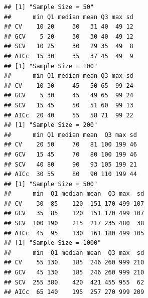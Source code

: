 \documentclass{article}\usepackage{graphicx, color}
\makeatletter
\newenvironment{kframe}{%
 \def\at@end@of@kframe{}%
 \ifinner\ifhmode%
  \def\at@end@of@kframe{\end{minipage}}%
  \begin{minipage}{\columnwidth}%
 \fi\fi%
 \def\FrameCommand##1{\hskip\@totalleftmargin \hskip-\fboxsep
 \colorbox{shadecolor}{##1}\hskip-\fboxsep
     \hskip-\linewidth \hskip-\@totalleftmargin \hskip\columnwidth}%
 \MakeFramed {\advance\hsize-\width
   \@totalleftmargin\z@ \linewidth\hsize
   \@setminipage}}%
 {\par\unskip\endMakeFramed%
 \at@end@of@kframe}
\newenvironment{knitrout}{}{} %
\makeatother
\begin{document}
\begin{knitrout}
\color{fgcolor}\begin{kframe}
\begin{verbatim}
## [1] "Sample Size = 50"
##      min Q1 median mean Q3 max sd
## CV    10 20     30   31 40  49 12
## GCV    5 20     30   30 40  49 12
## SCV   10 25     30   29 35  49  8
## AICc  15 30     35   37 45  49  9
## [1] "Sample Size = 100"
##      min Q1 median mean Q3 max sd
## CV    10 30     45   50 65  99 24
## GCV    5 30     45   49 65  99 24
## SCV   15 45     50   51 60  99 13
## AICc  20 40     55   58 71  99 22
## [1] "Sample Size = 200"
##      min Q1 median mean  Q3 max sd
## CV    20 50     70   81 100 199 46
## GCV   15 45     70   80 100 199 46
## SCV   40 80     90   93 105 199 21
## AICc  30 55     80   90 110 199 44
## [1] "Sample Size = 500"
##      min  Q1 median mean  Q3 max  sd
## CV    30  85    120  151 170 499 107
## GCV   35  85    120  151 170 499 107
## SCV  100 190    215  217 235 480  38
## AICc  45  95    130  161 180 499 105
## [1] "Sample Size = 1000"
##      min  Q1 median mean  Q3 max  sd
## CV    55 130    185  246 260 999 210
## GCV   45 130    185  246 260 999 210
## SCV  255 380    420  421 455 955  62
## AICc  65 140    195  257 270 999 209
\end{verbatim}
\end{kframe}
\end{knitrout}
\end{document}
